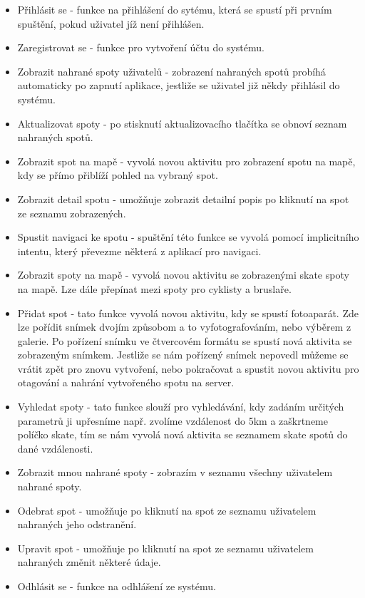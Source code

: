 \documentclass[12pt]{article}
\begin{document}
\begin{itemize}
\item Přihlásit se - funkce na přihlášení do sytému, která se spustí při prvním spuštění, pokud uživatel jíž není přihlášen.
\item Zaregistrovat se - funkce pro vytvoření účtu do systému.
\item Zobrazit nahrané spoty uživatelů - zobrazení nahraných spotů probíhá automaticky po zapnutí aplikace, jestliže se uživatel již někdy přihlásil do systému.
\item Aktualizovat spoty - po stisknutí aktualizovacího tlačítka se obnoví seznam nahraných spotů.
\item Zobrazit spot na mapě - vyvolá novou aktivitu pro zobrazení spotu na mapě, kdy se přímo přiblíží pohled na vybraný spot.
\item Zobrazit detail spotu - umožňuje zobrazit detailní popis po kliknutí na spot ze seznamu zobrazených.
\item Spustit navigaci ke spotu - spuštění této funkce se vyvolá pomocí implicitního intentu, který převezme některá z aplikací pro navigaci.
\item Zobrazit spoty na mapě - vyvolá novou aktivitu se zobrazenými skate spoty na mapě. Lze dále přepínat mezi spoty pro cyklisty a bruslaře.
\item Přidat spot - tato funkce vyvolá novou aktivitu, kdy se spustí fotoaparát. Zde lze pořídit snímek dvojím způsobom a to vyfotografováním, nebo výběrem z galerie. Po pořízení snímku ve čtvercovém formátu se spustí nová aktivita se zobrazeným snímkem. Jestliže se nám pořízený snímek nepovedl můžeme se vrátit zpět pro znovu vytvoření, nebo pokračovat a spustit novou aktivitu pro otagování a nahrání vytvořeného spotu na server.
\item Vyhledat spoty - tato funkce slouží pro vyhledávání, kdy zadáním určitých parametrů ji upřesníme např. zvolíme vzdálenost do 5km a zaškrtneme políčko skate, tím se nám vyvolá nová aktivita se seznamem skate spotů do dané vzdálenosti.
\item Zobrazit mnou nahrané spoty - zobrazím v seznamu všechny uživatelem nahrané spoty.
\item Odebrat spot - umožňuje po kliknutí na spot ze seznamu uživatelem nahraných jeho odstranění.
\item Upravit spot - umožňuje po kliknutí na spot ze seznamu uživatelem nahraných změnit některé údaje.
\item Odhlásit se - funkce na odhlášení ze systému.
\end{itemize}
\end{document}
